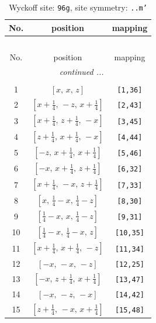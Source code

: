 \documentclass[fleqn,8pt]{jsarticle}
\begin{document}
\begin{longtable}{ccc}
\caption{Wyckoff site: {\tt 96g}, site symmetry: {\tt ..m'}}
 \\
 \hline \hline
No. & position & mapping \\ \hline \endfirsthead

\multicolumn{2}{l}{\tablename\ \thetable{}} \\
 \hline \hline
No. & position & mapping \\ \hline \endhead

 \hline \hline
\multicolumn{2}{r}{\footnotesize\it continued ...} \\ \endfoot

 \hline \hline
\multicolumn{2}{r}{} \\ \endlastfoot

1 & $\left[ x,\, x,\, z \right]$ & {\tt [1,36]} \\ \hline
2 & $\left[ x + \frac{1}{4},\, - z,\, x + \frac{1}{4} \right]$ & {\tt [2,43]} \\ \hline
3 & $\left[ x + \frac{1}{4},\, z + \frac{1}{4},\, - x \right]$ & {\tt [3,45]} \\ \hline
4 & $\left[ z + \frac{1}{4},\, x + \frac{1}{4},\, - x \right]$ & {\tt [4,44]} \\ \hline
5 & $\left[ - z,\, x + \frac{1}{4},\, x + \frac{1}{4} \right]$ & {\tt [5,46]} \\ \hline
6 & $\left[ - x,\, x + \frac{1}{4},\, z + \frac{1}{4} \right]$ & {\tt [6,32]} \\ \hline
7 & $\left[ x + \frac{1}{4},\, - x,\, z + \frac{1}{4} \right]$ & {\tt [7,33]} \\ \hline
8 & $\left[ x,\, \frac{1}{4} - x,\, \frac{1}{4} - z \right]$ & {\tt [8,30]} \\ \hline
9 & $\left[ \frac{1}{4} - x,\, x,\, \frac{1}{4} - z \right]$ & {\tt [9,31]} \\ \hline
10 & $\left[ \frac{1}{4} - x,\, \frac{1}{4} - x,\, z \right]$ & {\tt [10,35]} \\ \hline
11 & $\left[ x + \frac{1}{4},\, x + \frac{1}{4},\, - z \right]$ & {\tt [11,34]} \\ \hline
12 & $\left[ - x,\, - x,\, - z \right]$ & {\tt [12,25]} \\ \hline
13 & $\left[ - x,\, z + \frac{1}{4},\, x + \frac{1}{4} \right]$ & {\tt [13,47]} \\ \hline
14 & $\left[ - x,\, - z,\, - x \right]$ & {\tt [14,42]} \\ \hline
15 & $\left[ z + \frac{1}{4},\, - x,\, x + \frac{1}{4} \right]$ & {\tt [15,48]} \\ \hline

\end{longtable}
\end{document}
